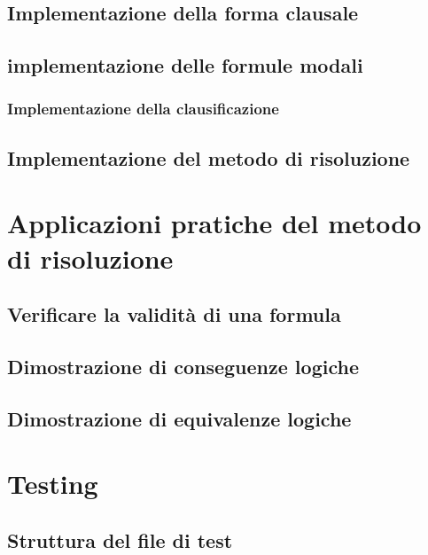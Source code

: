\documentclass[a4paper,12pt]{report}
\begin{document}
\section{Implementazione della forma clausale}

\section{implementazione delle formule modali}
\subsection{Implementazione della clausificazione}

\section{Implementazione del metodo di risoluzione}

















% 
% 
\chapter{Applicazioni pratiche del metodo di risoluzione}
\label{app}

\section{Verificare la validità di una formula}
\section{Dimostrazione di conseguenze logiche}
\section{Dimostrazione di equivalenze logiche}

% 
% 
\chapter{Testing}
\label{testing}

\section{Struttura del file di test}
\end{document}
